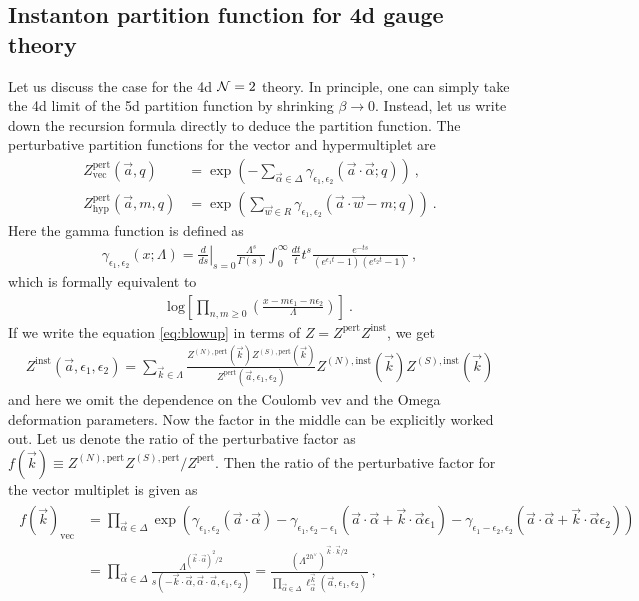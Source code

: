 \documentclass[letterpaper, 11pt]{article}
\def\CN{{\cal N}}
\def\a{\alpha}
\def\g{\gamma}
\def\e{\epsilon}
\begin{document}
\subsection{Instanton partition function for 4d gauge theory}
Let us discuss the case for the 4d $\CN=2$ theory. In principle, one can simply take the 4d limit of the 5d partition function by shrinking $\beta \to 0$. Instead, let us write down the recursion formula directly to deduce the partition function. 
The perturbative partition functions for the vector and hypermultiplet are
\begin{align}
 Z_{\textrm{vec}}^{\textrm{pert}}(\vec{a}, q) &= \exp \left( - \sum_{\vec \a \in \Delta} \gamma_{\e_1, \e_2}  (\vec{a} \cdot {\vec{\a}}; q )\right) \ , \\
 Z_{\textrm{hyp}}^{\textrm{pert}} (\vec{a}, m, q)&= \exp \left( \sum_{\vec{w} \in R} \gamma_{\e_1, \e_2} ( \vec{a} \cdot {\vec{w}} - m; q)\right) \ . 
\end{align}
Here the gamma function is defined as
\begin{align}
 \gamma_{\e_1, \e_2} (x; \Lambda) = \left. \frac{d}{ds} \right|_{s=0} \frac{\Lambda^s}{\Gamma(s)} \int_0^{\infty} \frac{dt}{t} t^s \frac{e^{-ts}}{(e^{\e_1 t} - 1)(e^{\e_2 t} - 1)} \ , 
\end{align}
which is formally equivalent to 
\begin{align}
 \textrm{log} \left[\prod_{n, m\ge 0} \left( \frac{x - m\e_1 - n \e_2}{\Lambda} \right) \right] \ . 
\end{align}
If we write the equation \eqref{eq:blowup} in terms of $Z = Z^{\textrm{pert}} Z^{\textrm{inst}}$, we get
\begin{align}
 Z^{\textrm{inst}}(\vec{a}, \e_1, \e_2) = \sum_{\vec{k} \in \Lambda} \frac{Z^{(N), \textrm{pert}}(\vec{k}) Z^{(S), \textrm{pert}}(\vec{k})}{Z^{\textrm{pert}}(\vec{a}, \e_1, \e_2)} Z^{(N), \textrm{inst}}(\vec{k} ) Z^{(S), \textrm{inst}}(\vec{k})
\end{align}
and here we omit the dependence on the Coulomb vev and the Omega deformation parameters. 
Now the factor in the middle can be explicitly worked out. Let us denote the ratio of the perturbative factor as $f(\vec{k}) \equiv Z^{(N), \textrm{pert}} Z^{(S), \textrm{pert}}/Z^{\textrm{pert}}$. 
Then the ratio of the perturbative factor for the vector multiplet is given as
\begin{align} \label{eq:1loopvec4d}
\begin{split}
f(\vec{k})_{\textrm{vec}} &= \prod_{\vec{\a} \in \Delta} \exp \left( \g_{\e_1, \e_2} (\vec{a}\cdot \vec{\a}) - \g_{\e_1, \e_2 - \e_1}(\vec{a}\cdot \vec{\a} + \vec{k}\cdot\vec{\a} \e_1) -  \g_{\e_1 - \e_2, \e_2 }(\vec{a}\cdot \vec{\a} +  \vec{k}\cdot\vec{\a} \e_2)   \right) \\
 &= \prod_{\vec{\a} \in \Delta}  \frac{\Lambda^{(\vec{k} \cdot \vec{\a})^2 /2} }{s(-\vec{k}\cdot \vec{\a}, \vec{\a}\cdot \vec{a}, \e_1, \e_2) }
 = \frac{(\Lambda^{2 h^\vee})^{\vec{k} \cdot \vec{k}/2} }{\prod_{\vec{\a} \in \Delta} \ell^{\vec{k}}_{\vec{\a}} (\vec{a}, \e_1, \e_2) } \ , 
\end{split}
\end{align}
\end{document}
